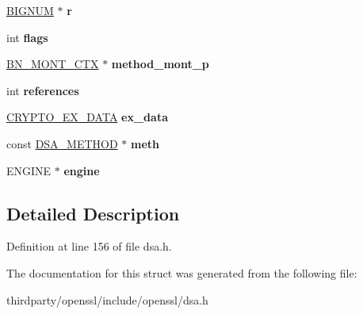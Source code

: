 \begin{DoxyCompactItemize}
\mbox{\label{structdsa__st_ab301cd06470fbfae28764c2115b60d97}} 
\hyperlink{structbignum__st}{B\+I\+G\+N\+UM} $\ast$ {\bfseries r}
\item 
\mbox{\label{structdsa__st_a3c27d330e3e07368715455b5a019690d}} 
int {\bfseries flags}
\item 
\mbox{\label{structdsa__st_aea9e4de390af7d5bc289a203824ffb5f}} 
\hyperlink{structbn__mont__ctx__st}{B\+N\+\_\+\+M\+O\+N\+T\+\_\+\+C\+TX} $\ast$ {\bfseries method\+\_\+mont\+\_\+p}
\item 
\mbox{\label{structdsa__st_a4a1337f8a116a7f1b322639edfa9d580}} 
int {\bfseries references}
\item 
\mbox{\label{structdsa__st_a0def4851606ac230c65f4409de2c0c71}} 
\hyperlink{structcrypto__ex__data__st}{C\+R\+Y\+P\+T\+O\+\_\+\+E\+X\+\_\+\+D\+A\+TA} {\bfseries ex\+\_\+data}
\item 
\mbox{\label{structdsa__st_af5e872d3d77bbba895b6b917f1a71d3a}} 
const \hyperlink{structdsa__method}{D\+S\+A\+\_\+\+M\+E\+T\+H\+OD} $\ast$ {\bfseries meth}
\item 
\mbox{\label{structdsa__st_a0cfa8000f47729c5eb6cc2053eb01b75}} 
E\+N\+G\+I\+NE $\ast$ {\bfseries engine}
\end{DoxyCompactItemize}


\subsection{Detailed Description}


Definition at line 156 of file dsa.\+h.



The documentation for this struct was generated from the following file\+:\begin{DoxyCompactItemize}
\item 
thirdparty/openssl/include/openssl/dsa.\+h\end{DoxyCompactItemize}
